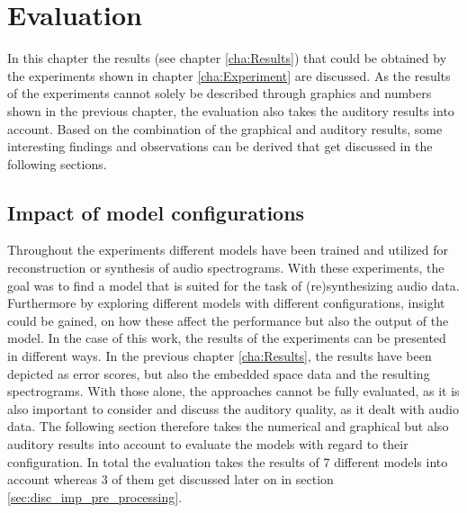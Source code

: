 \chapter{Evaluation}
\label{cha:Discussion}

In this chapter the results (see chapter \ref{cha:Results}) that could be obtained by the experiments shown in chapter \ref{cha:Experiment} are discussed. As the results of the experiments cannot solely be described through graphics and numbers shown in the previous chapter, the evaluation also takes the auditory results into account. Based on the combination of the graphical and auditory results, some interesting findings and observations can be derived that get discussed in the following sections.


\section{Impact of model configurations}
\label{sec:disc_model_conf}
Throughout the experiments different models have been trained and utilized for reconstruction or synthesis of audio spectrograms. With these experiments, the goal was to find a model that is suited for the task of (re)synthesizing audio data. Furthermore by exploring different models with different configurations, insight could be gained, on how these affect the performance but also the output of the model. In the case of this work, the results of the experiments can be presented in different ways. In the previous chapter \ref{cha:Results}, the results have been depicted as error scores, but also the embedded space data and the resulting spectrograms. With those alone, the approaches cannot be fully evaluated, as it is also important to consider and discuss the auditory quality, as it dealt with audio data. The following section therefore takes the numerical and graphical but also auditory results into account to evaluate the models with regard to their configuration. In total the evaluation takes the results of 7 different models into account whereas 3 of them get discussed later on in section \ref{sec:disc_imp_pre_processing}.

